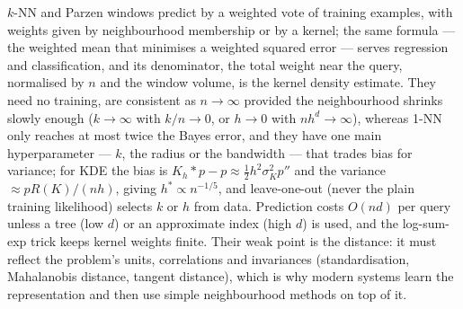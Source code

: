 \documentclass[11pt]{article}
\begin{document}
\begin{keyidea}[Summary]
$k$-NN and Parzen windows predict by a weighted vote of training examples, with weights given by neighbourhood
membership or by a kernel; the same formula --- the weighted mean that minimises a weighted squared error --- serves
regression and classification, and its denominator, the total weight near the query, normalised by $n$ and the window
volume, is the kernel density estimate. They need no training, are consistent as
$n \to \infty$ provided the neighbourhood shrinks slowly enough ($k \to \infty$ with $k/n \to 0$, or $h \to 0$ with
$nh^d \to \infty$), whereas 1-NN only reaches at most twice the Bayes error, and they have one main hyperparameter --- $k$, the radius or the bandwidth --- that trades bias for
variance; for KDE the bias is $K_h * p - p \approx \tfrac{1}{2}h^2 \sigma_K^2 p''$ and the variance
$\approx p R(K)/(nh)$, giving $h^* \propto n^{-1/5}$, and leave-one-out (never the plain training likelihood) selects
$k$ or $h$ from data. Prediction costs $O(nd)$ per query unless a tree (low $d$) or an approximate index (high $d$)
is used, and the log-sum-exp trick keeps kernel weights finite. Their weak point is the distance: it must reflect the
problem's units, correlations and invariances (standardisation, Mahalanobis distance, tangent distance), which is
why modern systems learn the representation and then use
simple neighbourhood methods on top of it.
\end{keyidea}
\end{document}
